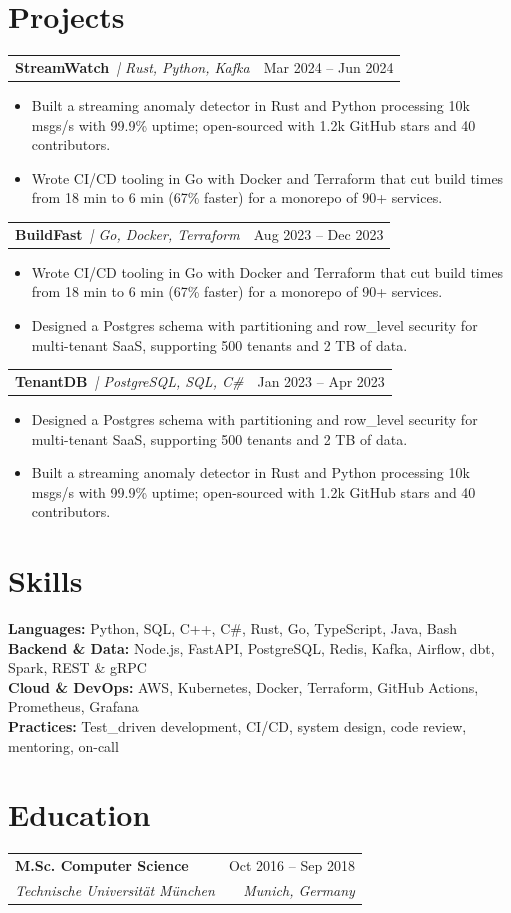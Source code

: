 \documentclass[10pt]{article}
\makeatletter
\newcommand{\resumeEntry}[4]{%
  \begin{tabularx}{\linewidth}{@{}X r@{}}
    \textbf{#1} & \small #2\\
    \textit{\small #3} & \textit{\small #4}
  \end{tabularx}\vspace{-2pt}}
\newcommand{\resumeProject}[3]{%
  \begin{tabularx}{\linewidth}{@{}X r@{}}
    \textbf{#1} \,\textit{\small | #2} & \small #3
  \end{tabularx}\vspace{-2pt}}
\newenvironment{resumeItems}{\begin{itemize}\small}{\end{itemize}\vspace{2pt}}
\newcommand{\resumeItem}[1]{\item #1}
\newcommand{\skillLine}[2]{\small\textbf{#1:} #2\\}
\makeatother
\begin{document}
\section{Projects}
\resumeProject{StreamWatch}{Rust, Python, Kafka}{Mar 2024 -- Jun 2024}
\begin{resumeItems}
  \resumeItem{Built a streaming anomaly detector in Rust and Python processing 10k msgs/s with 99.9\% uptime; open-sourced with 1.2k GitHub stars and 40 contributors.}
  \resumeItem{Wrote CI/CD tooling in Go with Docker and Terraform that cut build times from 18 min to 6 min (67\% faster) for a monorepo of 90+ services.}
\end{resumeItems}
\resumeProject{BuildFast}{Go, Docker, Terraform}{Aug 2023 -- Dec 2023}
\begin{resumeItems}
  \resumeItem{Wrote CI/CD tooling in Go with Docker and Terraform that cut build times from 18 min to 6 min (67\% faster) for a monorepo of 90+ services.}
  \resumeItem{Designed a Postgres schema with partitioning and row\_level security for multi-tenant SaaS, supporting 500 tenants and 2 TB of data.}
\end{resumeItems}
\resumeProject{TenantDB}{PostgreSQL, SQL, C\#}{Jan 2023 -- Apr 2023}
\begin{resumeItems}
  \resumeItem{Designed a Postgres schema with partitioning and row\_level security for multi-tenant SaaS, supporting 500 tenants and 2 TB of data.}
  \resumeItem{Built a streaming anomaly detector in Rust and Python processing 10k msgs/s with 99.9\% uptime; open-sourced with 1.2k GitHub stars and 40 contributors.}
\end{resumeItems}

\section{Skills}
\skillLine{Languages}{Python, SQL, C++, C\#, Rust, Go, TypeScript, Java, Bash}
\skillLine{Backend \& Data}{Node.js, FastAPI, PostgreSQL, Redis, Kafka, Airflow, dbt, Spark, REST \& gRPC}
\skillLine{Cloud \& DevOps}{AWS, Kubernetes, Docker, Terraform, GitHub Actions, Prometheus, Grafana}
\skillLine{Practices}{Test\_driven development, CI/CD, system design, code review, mentoring, on-call}
\section{Education}
\resumeEntry{M.Sc. Computer Science}{Oct 2016 -- Sep 2018}{Technische Universität München}{Munich, Germany}
\end{document}
